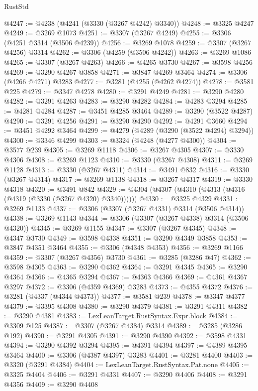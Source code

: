 \begin{lexlean}{RustStd}
\begin{coremodule}
@4247 := @4238 (@4241 (@3330 (@3267 @4242) @3340))
@4248 := @3325 @4247
@4249 := @3269 @1073
@4251 := @3307 (@3267 @4249)
@4255 := @3306 (@4251 @3314 (@3506 @4239))
@4256 := @3269 @1078
@4259 := @3307 (@3267 @4256) @3314
@4262 := @3306 (@4259 (@3506 @4242))
@4263 := @3269 @1086
@4265 := @3307 (@3267 @4263)
@4266 := @4265 @3730
@4267 := @3598 @4256
@4269 := @3290 @4267 @3858
@4271 := @3847 @4269 @3464
@4274 := @3306 (@4266 @4271) @3283
@4277 := @3281 (@4255 (@4262 @4274))
@4278 := @3581 @225
@4279 := @3347 @4278
@4280 := @3291 @4249
@4281 := @3290 @4280
@4282 := @3291 @4263
@4283 := @3290 @4282
@4284 := @4283 @3294
@4285 := @4281 @4284
@4287 := @3451 @4285 @3464
@4289 := @3290 (@3522 @4287)
@4290 := @3291 @4256
@4291 := @3290 @4290
@4292 := @4291 @3660
@4294 := @3451 @4292 @3464
@4299 := @4279 (@4289 (@3290 (@3522 @4294) @3294))
@4300 := @3346 @4299
@4303 := @3324 (@4248 (@4277 @4300))
@4304 := @3577 @239
@4305 := @3269 @1118
@4306 := @3267 @4305
@4307 := @3330 @4306
@4308 := @3269 @1123
@4310 := @3330 (@3267 @4308)
@4311 := @3269 @1128
@4313 := @3330 (@3267 @4311)
@4314 := @3491 @832
@4316 := @3330 (@3267 @4314)
@4317 := @3269 @1138
@4318 := @3267 @4317
@4319 := @3330 @4318
@4320 := @3491 @842
@4329 := @4304 (@4307 (@4310 (@4313 (@4316 (@4319 (@3330 (@3267 @4320) @3340))))))
@4330 := @3325 @4329
@4331 := @3269 @1133
@4337 := @3306 (@3307 (@3267 @4331) @3314 (@3506 @4314))
@4338 := @3269 @1143
@4344 := @3306 (@3307 (@3267 @4338) @3314 (@3506 @4320))
@4345 := @3269 @1155
@4347 := @3307 (@3267 @4345)
@4348 := @4347 @3730
@4349 := @3598 @4338
@4351 := @3290 @4349 @3858
@4353 := @3847 @4351 @3464
@4355 := @3306 (@4348 @4353)
@4356 := @3269 @1166
@4359 := @3307 (@3267 @4356) @3730
@4361 := @3285 (@3286 @47)
@4362 := @3598 @4305
@4363 := @3290 @4362
@4364 := @3291 @4345
@4365 := @3290 @4364
@4366 := @4365 @3294
@4367 := @4363 @4366
@4369 := @4361 @4367 @3297
@4372 := @3306 (@4359 @4369) @3283
@4373 := @4355 @4372
@4376 := @3281 (@4337 (@4344 @4373))
@4377 := @3581 @239
@4378 := @3347 @4377
@4379 := @3395 @4308
@4380 := @3290 @4379
@4381 := @3291 @4311
@4382 := @3290 @4381
@4383 := LexLeanTarget.RustSyntax.Expr.block
@4384 := @3309 @125
@4387 := @3307 (@3267 @4384) @3314
@4389 := @3285 (@3286 @192)
@4390 := @3291 @4305
@4391 := @3290 @4390
@4392 := @3598 @4331
@4394 := @3290 @4392 @3294
@4395 := @4391 @4394
@4397 := @4389 @4395 @3464
@4400 := @3306 (@4387 @4397) @3283
@4401 := @3281 @4400
@4403 := @3320 (@3291 @4384)
@4404 := LexLeanTarget.RustSyntax.Pat.none
@4405 := @3325 @4404
@4406 := @3291 @4331
@4407 := @3290 @4406
@4408 := @3291 @4356
@4409 := @3290 @4408

\end{coremodule}
\end{lexlean}
